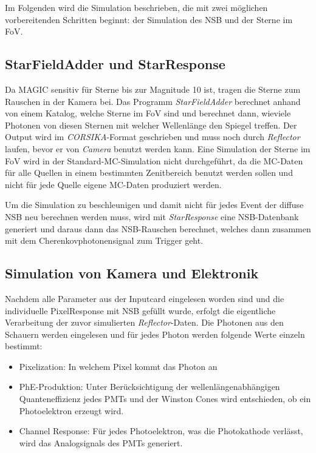 Im Folgenden wird die Simulation beschrieben, die mit zwei möglichen vorbereitenden Schritten beginnt: der Simulation des NSB und der Sterne im FoV.

\subsection{StarFieldAdder und StarResponse}
Da MAGIC sensitiv für Sterne bis zur Magnitude 10 ist, tragen die Sterne zum Rauschen in der Kamera bei.
Das Programm \textit{StarFieldAdder} berechnet anhand von einem Katalog, welche Sterne im FoV sind und berechnet dann, wieviele Photonen von diesen Sternen mit welcher Wellenlänge den Spiegel treffen.
Der Output wird im \textit{CORSIKA}-Format geschrieben und muss noch durch \textit{Reflector} laufen, bevor er von \textit{Camera} benutzt werden kann.
Eine Simulation der Sterne im FoV wird in der Standard-MC-Simulation nicht durchgeführt, da die MC-Daten für alle Quellen in einem bestimmten Zenitbereich benutzt werden sollen und nicht für jede Quelle eigene MC-Daten produziert werden.

Um die Simulation zu beschleunigen und damit nicht für jedes Event der diffuse NSB neu berechnen werden muss, wird mit \textit{StarResponse} eine NSB-Datenbank generiert und daraus dann das NSB-Rauschen berechnet, welches dann zusammen mit dem Cherenkovphotonensignal zum Trigger geht.

\subsection{Simulation von Kamera und Elektronik}
Nachdem alle Parameter aus der Inputcard eingelesen worden sind und die individuelle PixelResponse mit NSB gefüllt wurde, erfolgt die eigentliche Verarbeitung der zuvor simulierten \textit{Reflector}-Daten.
Die Photonen aus den Schauern werden eingelesen und für jedes Photon werden folgende Werte einzeln bestimmt:

\begin{itemize}
 \item Pixelization: In welchem Pixel kommt das Photon an
 \item PhE-Produktion: Unter Berücksichtigung der wellenlängenabhängigen Quanteneffizienz jedes PMTs und der Winston Cones wird entschieden, ob ein Photoelektron erzeugt wird.
 \item Channel Response: Für jedes Photoelektron, was die Photokathode verlässt, wird das Analogsignals des PMTs generiert.
\end{itemize}

